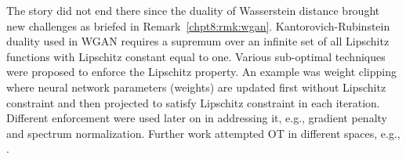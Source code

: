 The story did not end there since the duality of Wasserstein distance brought new challenges as briefed in Remark~\ref{chpt8:rmk:wgan}.
Kantorovich-Rubinstein duality used in WGAN requires a supremum over
an infinite set of all Lipschitz functions with Lipschitz constant equal
to one. Various sub-optimal techniques were proposed to enforce the
Lipschitz property. An example was weight clipping
\cite{2017arXiv170107875A} where neural network parameters (weights)
are updated first without Lipschitz constraint and then projected to
satisfy Lipschitz constraint in each iteration. Different enforcement were used later on in addressing it, e.g., gradient penalty\cite{2017arXiv170400028G} and spectrum normalization\cite{2018arXiv180205957M}. Further work attempted OT in different spaces, e.g., \cite{gemici2018primaldual, adler2018banach}.


